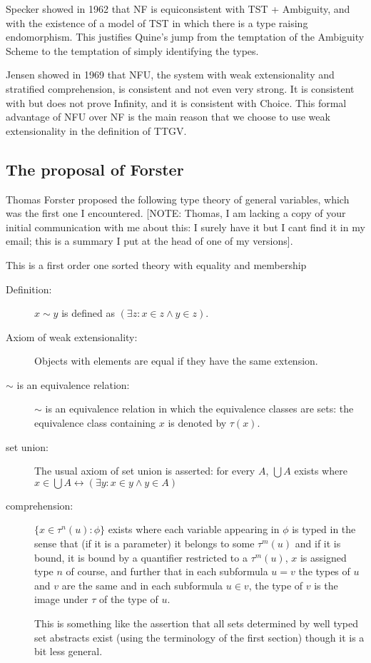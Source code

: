\documentclass[12pt]{article}
\begin{document}
Specker showed in 1962 that NF is equiconsistent with TST + Ambiguity, and with the existence of a model of TST in which there is a type raising endomorphism.  This justifies Quine's jump from the temptation of the Ambiguity Scheme to the temptation of simply identifying the types.

Jensen showed in 1969 that NFU, the system with weak extensionality and stratified comprehension, is consistent and not even very strong.  It is consistent with but does not prove Infinity, and it is consistent with Choice.  This formal advantage of NFU over NF is the main reason that we choose to use weak extensionality in the definition of TTGV.

\subsection{The proposal of Forster}

Thomas Forster proposed the following type theory of general variables, which was the first one I encountered.  [NOTE:  Thomas, I am lacking a copy of your initial communication with me about this:  I surely have it but I cant find it in my email;  this is a summary I put at the head of one of my versions].

This is a first order one sorted theory with equality and membership

\begin{description}

\item[Definition:]  $x \sim y$ is defined as $(\exists z:x \in z \wedge y \in z)$.

\item[Axiom of weak extensionality:]  Objects with elements are equal if they have the same extension.

\item[$\sim$ is an equivalence relation:]  $\sim$ is an equivalence relation in which the equivalence classes are sets:  the equivalence class containing $x$ is denoted by $\tau(x)$.

\item[set union:]  The usual axiom of set union is asserted:  for every $A$, $\bigcup A$ exists where $x \in \bigcup A \leftrightarrow (\exists y:x \in y \wedge y \in A)$

\item[comprehension:]  $\{x \in \tau^n(u):\phi\}$ exists
where each variable appearing in $\phi$ is typed in the sense that
(if it is a parameter) it belongs to some $\tau^m(u)$ and if it is bound, it is bound by a quantifier restricted to a $\tau^m(u)$, $x$ is assigned type $n$ of course, and further that in each subformula $u=v$ the types of $u$ and $v$ are the same and in each subformula $u \in v$, the type of $v$ is the image under $\tau$ of the type of $u$.

This is something like the assertion that all sets determined by well typed set abstracts exist (using the terminology of the first section) though it is a bit less general.


\end{description}
\end{document}

